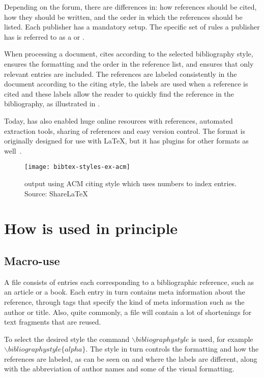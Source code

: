 Depending on the forum, there are differences in: how references
should be cited, how they should be written, and the order in which
the references should be listed.  Each publisher has a mandatory
setup.  The specific set of rules a publisher has is referred to as a
 or .

When processing a document, {\bibtex} cites according to the selected
bibliography style, ensures the formatting and the order in the
reference list, and ensures that only relevant entries are included.
The references are labeled consistently in the document according to
the citing style, the labels are used when a reference is cited and
these labels allow the reader to quickly find the reference in the
bibliography, as illustrated in .

Today, {\bibtex} has also enabled huge online resources with
references, automated extraction tools, sharing of references and easy
version control.  The {\bibtex} format is originally designed for use
with {\LaTeX}, but it has plugins for other formats as
well~\cite{bibtex_resource}.

\begin{figure}
  \centering
  \texttt{[image: bibtex-styles-ex-acm]}
  \caption{{\bibtex} output using ACM citing style which uses numbers to
    index entries.  Source: ShareLaTeX~\cite{sharelatex2016_styles}}
\label{fig:bibtex_example_acm}
\end{figure}

\section{How {\bibtex} is used in principle}
\label{sec:practice_of_bibtex}

\subsection{Macro-use}

A {\bibtex} file consists of entries each corresponding to a
bibliographic reference, such as an article or a book.  Each entry in
turn contains meta information about the reference, through tags that
specify the kind of meta information such as the author or title.
Also, quite commonly, a file will contain a lot of shortenings for
text fragments that are reused.

To select the desired style the command
${\backslash}bibliographystyle$ is used, for example
${\backslash}bibliographystyle\{alpha\}$.  The style in turn controls
the formatting and how the references are labeled, as can be seen on
 and 
where the labels are different, along with the abbreviation of author
names and some of the visual formatting.

